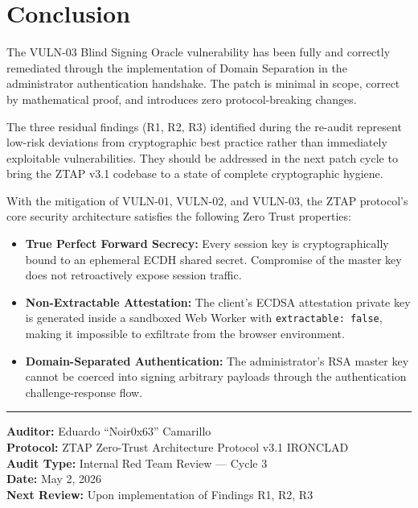 \documentclass[12pt,a4paper]{article}
\begin{document}
\section{Conclusion}

The VULN-03 Blind Signing Oracle vulnerability has been fully and correctly remediated through the implementation of Domain Separation in the administrator authentication handshake. The patch is minimal in scope, correct by mathematical proof, and introduces zero protocol-breaking changes.

The three residual findings (R1, R2, R3) identified during the re-audit represent low-risk deviations from cryptographic best practice rather than immediately exploitable vulnerabilities. They should be addressed in the next patch cycle to bring the ZTAP v3.1 codebase to a state of complete cryptographic hygiene.

With the mitigation of VULN-01, VULN-02, and VULN-03, the ZTAP protocol's core security architecture satisfies the following Zero Trust properties:

\begin{itemize}
    \item \textbf{True Perfect Forward Secrecy:} Every session key is cryptographically bound to an ephemeral ECDH shared secret. Compromise of the master key does not retroactively expose session traffic.
    \item \textbf{Non-Extractable Attestation:} The client's ECDSA attestation private key is generated inside a sandboxed Web Worker with \texttt{extractable: false}, making it impossible to exfiltrate from the browser environment.
    \item \textbf{Domain-Separated Authentication:} The administrator's RSA master key cannot be coerced into signing arbitrary payloads through the authentication challenge-response flow.
\end{itemize}

\vspace{2em}
\hrule
\vspace{1em}
\noindent\textbf{Auditor:} Eduardo ``Noir0x63'' Camarillo\\
\textbf{Protocol:} ZTAP Zero-Trust Architecture Protocol v3.1 IRONCLAD\\
\textbf{Audit Type:} Internal Red Team Review — Cycle 3\\
\textbf{Date:} May 2, 2026\\
\textbf{Next Review:} Upon implementation of Findings R1, R2, R3
\end{document}

